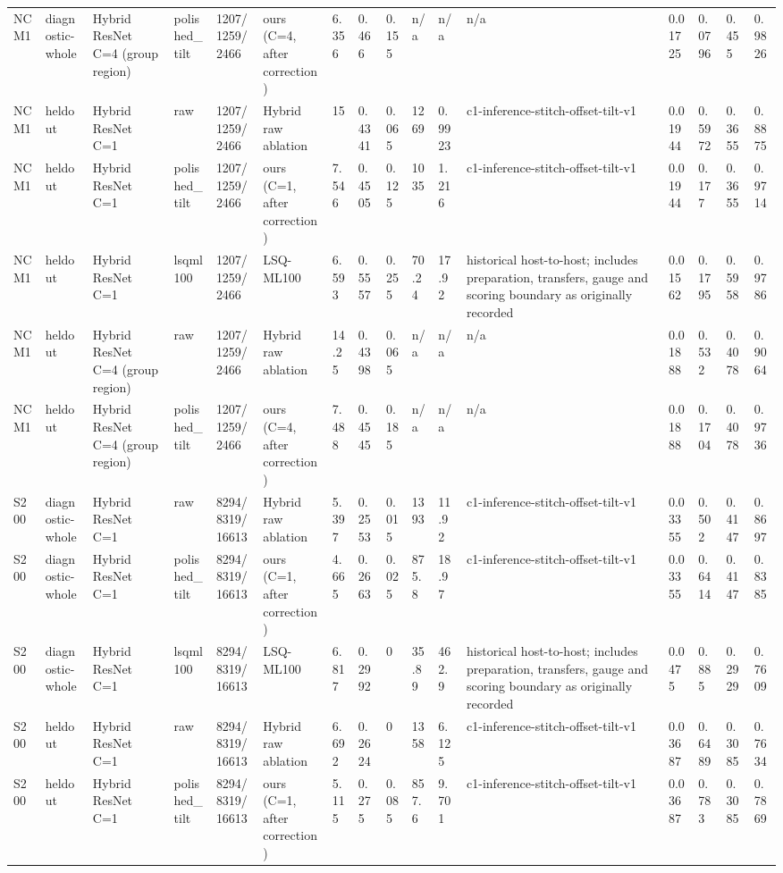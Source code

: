 \begin{tabular}{llllllllllllllll}
NCM1 & diagnostic-whole & Hybrid ResNet C=4 (group region) & polished\_tilt & 1207/1259/2466 & ours (C=4, after correction) & 6.356 & 0.466 & 0.155 & n/a & n/a & n/a & 0.01725 & 0.0796 & 0.455 & 0.9826 \\
NCM1 & heldout & Hybrid ResNet C=1 & raw & 1207/1259/2466 & Hybrid raw ablation & 15 & 0.4341 & 0.065 & 1269 & 0.9923 & c1-inference-stitch-offset-tilt-v1 & 0.01944 & 0.5972 & 0.3655 & 0.8875 \\
NCM1 & heldout & Hybrid ResNet C=1 & polished\_tilt & 1207/1259/2466 & ours (C=1, after correction) & 7.546 & 0.4505 & 0.125 & 1035 & 1.216 & c1-inference-stitch-offset-tilt-v1 & 0.01944 & 0.177 & 0.3655 & 0.9714 \\
NCM1 & heldout & Hybrid ResNet C=1 & lsqml100 & 1207/1259/2466 & LSQ-ML100 & 6.593 & 0.5557 & 0.255 & 70.24 & 17.92 & historical host-to-host; includes preparation, transfers, gauge and scoring boundary as originally recorded & 0.01562 & 0.1795 & 0.5958 & 0.9786 \\
NCM1 & heldout & Hybrid ResNet C=4 (group region) & raw & 1207/1259/2466 & Hybrid raw ablation & 14.25 & 0.4398 & 0.065 & n/a & n/a & n/a & 0.01888 & 0.532 & 0.4078 & 0.9064 \\
NCM1 & heldout & Hybrid ResNet C=4 (group region) & polished\_tilt & 1207/1259/2466 & ours (C=4, after correction) & 7.488 & 0.4545 & 0.185 & n/a & n/a & n/a & 0.01888 & 0.1704 & 0.4078 & 0.9736 \\
S200 & diagnostic-whole & Hybrid ResNet C=1 & raw & 8294/8319/16613 & Hybrid raw ablation & 5.397 & 0.2553 & 0.015 & 1393 & 11.92 & c1-inference-stitch-offset-tilt-v1 & 0.03355 & 0.502 & 0.4147 & 0.8697 \\
S200 & diagnostic-whole & Hybrid ResNet C=1 & polished\_tilt & 8294/8319/16613 & ours (C=1, after correction) & 4.665 & 0.2663 & 0.025 & 875.8 & 18.97 & c1-inference-stitch-offset-tilt-v1 & 0.03355 & 0.6414 & 0.4147 & 0.8385 \\
S200 & diagnostic-whole & Hybrid ResNet C=1 & lsqml100 & 8294/8319/16613 & LSQ-ML100 & 6.817 & 0.2992 & 0 & 35.89 & 462.9 & historical host-to-host; includes preparation, transfers, gauge and scoring boundary as originally recorded & 0.0475 & 0.885 & 0.2929 & 0.7609 \\
S200 & heldout & Hybrid ResNet C=1 & raw & 8294/8319/16613 & Hybrid raw ablation & 6.692 & 0.2624 & 0 & 1358 & 6.125 & c1-inference-stitch-offset-tilt-v1 & 0.03687 & 0.6489 & 0.3085 & 0.7634 \\
S200 & heldout & Hybrid ResNet C=1 & polished\_tilt & 8294/8319/16613 & ours (C=1, after correction) & 5.115 & 0.275 & 0.085 & 857.6 & 9.701 & c1-inference-stitch-offset-tilt-v1 & 0.03687 & 0.783 & 0.3085 & 0.7869 \\

\end{tabular}

